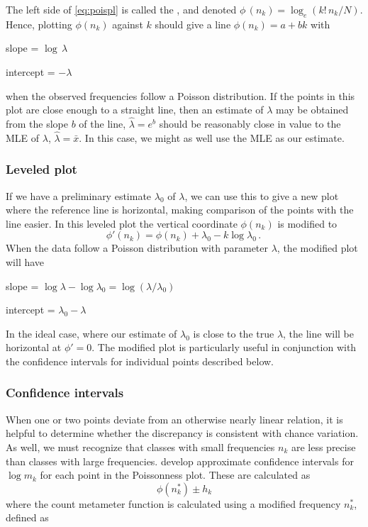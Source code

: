 The left side of \eqref{eq:poispl} is called the , and
denoted \(\phi \,  ( n_k )  = \log_e ( k ! \,  n_k  /  N )\).  Hence,
plotting \(\phi ( n_k )\) against \(k\) should give a line
\(\phi ( n_k )= a + b k\) with

\begin{itemize*}
\item slope = \(\log  \,  \lambda\)
\item intercept = \(- \lambda\)
\end{itemize*}
when the observed frequencies follow a Poisson distribution.
If the points in this plot are close enough to a straight line,
then an estimate of $\lambda$ may be obtained from the slope $b$ of the line,
$\hat{\lambda} = e^b$ should be reasonably close in value
to the MLE of $\lambda$, $\hat{\lambda} = \bar{x}$.
In this case, we might as well use the MLE as our estimate.

\subsubsection{Leveled plot}
If we have a preliminary estimate $\lambda_0$ of $\lambda$,
we can use this to give a new plot where the reference line
is horizontal, making comparison of the points with the line
easier.
In this leveled plot the vertical coordinate $\phi (n_k)$ is modified to
\begin{equation*}
 \phi ' (n_k) = \phi (n_k) + \lambda_0 - k \log \lambda_0
 \period
\end{equation*}
When the data follow a Poisson distribution with parameter
$\lambda$, the modified plot will have
\begin{itemize*}
\item slope = \(\log  \lambda - \log  \lambda_0 = \log ( \lambda / \lambda_0 ) \)
\item intercept = \(\lambda_0 - \lambda\)
\end{itemize*}
In the ideal case, where our estimate of $\lambda_0$ is close to the true
$\lambda$, the line will be horizontal at $\phi ' = 0$.
The modified plot is particularly useful in conjunction with the
confidence intervals for individual points described below.

\subsubsection{Confidence intervals}
When one or two points deviate from an otherwise nearly linear
relation,
it is helpful to determine whether the discrepancy is consistent with
chance variation.
As well, we must recognize that classes with small frequencies $n_k$
are less precise than classes with large frequencies.
\citet{HoaglinTukey:85} develop approximate confidence intervals
for $\log m_k$ for each point in the Poissonness plot.
These are calculated as
\begin{equation*}
\phi \left( n_k^{*}\right) \pm h_k
\end{equation*}
where the count metameter function is calculated using a modified frequency $%
n_k^{*}$, defined as

